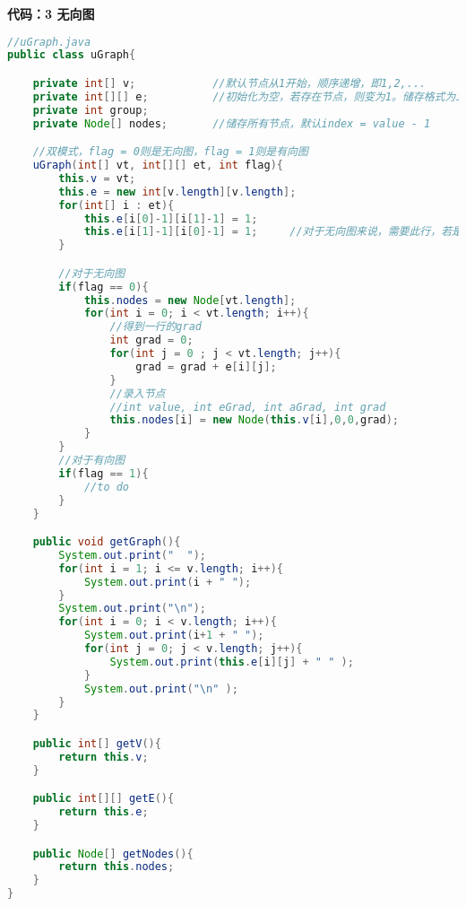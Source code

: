 \newpage

\noindent \textbf{代码：3 无向图}

\begin{lstlisting}[language = java]
//uGraph.java
public class uGraph{

    private int[] v;            //默认节点从1开始，顺序递增，即1,2,...
    private int[][] e;          //初始化为空，若存在节点，则变为1。储存格式为二维数组，横纵角标对应节点编号，0为1,1为2...
    private int group;
    private Node[] nodes;       //储存所有节点，默认index = value - 1

    //双模式，flag = 0则是无向图，flag = 1则是有向图
    uGraph(int[] vt, int[][] et, int flag){
        this.v = vt;
        this.e = new int[v.length][v.length];
        for(int[] i : et){
            this.e[i[0]-1][i[1]-1] = 1;
            this.e[i[1]-1][i[0]-1] = 1;     //对于无向图来说，需要此行，若是有向图，则需要删除此行。
        }

        //对于无向图
        if(flag == 0){
            this.nodes = new Node[vt.length];
            for(int i = 0; i < vt.length; i++){
                //得到一行的grad
                int grad = 0;
                for(int j = 0 ; j < vt.length; j++){
                    grad = grad + e[i][j];
                }
                //录入节点
                //int value, int eGrad, int aGrad, int grad
                this.nodes[i] = new Node(this.v[i],0,0,grad);
            }
        }
        //对于有向图
        if(flag == 1){
            //to do
        }
    }

    public void getGraph(){
        System.out.print("  ");
        for(int i = 1; i <= v.length; i++){
            System.out.print(i + " ");
        }
        System.out.print("\n");
        for(int i = 0; i < v.length; i++){
            System.out.print(i+1 + " ");
            for(int j = 0; j < v.length; j++){
                System.out.print(this.e[i][j] + " " );
            }
            System.out.print("\n" );
        }
    }

    public int[] getV(){
        return this.v;
    }

    public int[][] getE(){
        return this.e;
    }

    public Node[] getNodes(){
        return this.nodes;
    }
}
\end{lstlisting}

